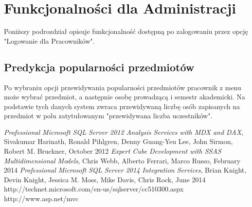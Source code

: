 \documentclass[licencjacka]{pracamgr}
\begin{document}
\section{Funkcjonalności dla Administracji}

Poniższy podrozdział opisuje funkcjonalność dostępną po zalogowaniu przez opcję "Logowanie dla Pracowników".

\subsection{Predykcja popularności przedmiotów}
Po wybraniu opcji przewidywania popularności przedmiotów pracownik z menu może wybrać przedmiot, a następnie osobę prowadzącą i semestr akademicki. Na podstawie tych danych system zwraca przewidywaną liczbę osób zapisanych na przedmiot w polu zatytułowanym "przewidywana liczba uczestników".

\begin{thebibliography}{99}
\emph{Professional Microsoft SQL Server 2012 Analysis Services with MDX and DAX},
Sivakumar Harinath, Ronald Pihlgren, Denny Guang-Yeu Lee, John Sirmon, Robert M. Bruckner,
October 2012
\emph{Expert Cube Development with SSAS Multidimensional Models},
Chris Webb, Alberto Ferrari, Marco Russo,
February 2014
\emph{Professional Microsoft SQL Server 2014 Integration Services},
Brian Knight, Devin Knight, Jessica M. Moss, Mike Davis, Chris Rock,
June 2014
http://technet.microsoft.com/en-us/sqlserver/cc510300.aspx
http://www.asp.net/mvc
\end{thebibliography}
\end{document}
